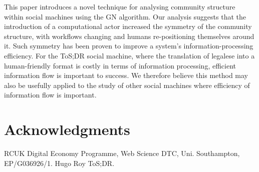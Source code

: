 \documentclass{sig-alternate}
\begin{document}
This paper introduces a novel technique for analysing community structure within social machines using the GN algorithm. Our analysis suggests that the introduction of a computational actor increased the symmetry of the community structure, with workflows changing and humans re-positioning themselves around it. Such symmetry has been proven to improve a system's information-processing efficiency. For the ToS;DR social machine, where the translation of legalese into a human-friendly format is costly in terms of information processing, efficient information flow is important to success. We therefore believe this method may also be usefully applied to the study of other social machines where efficiency of information flow is important.


\section{Acknowledgments}
RCUK Digital Economy Programme, Web Science DTC, Uni. Southampton, EP/G036926/1. Hugo Roy ToS;DR.
\end{document}
